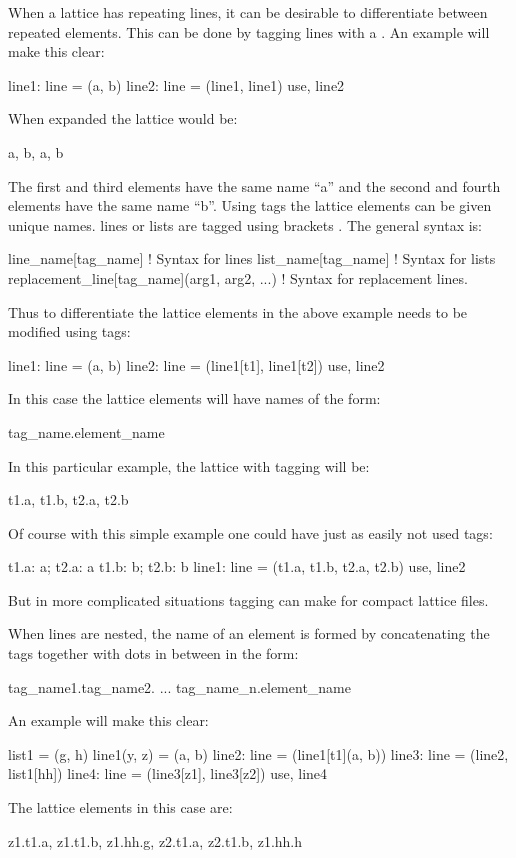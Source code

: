 When a lattice has repeating lines, it can be desirable to differentiate
between repeated elements. This can be done by tagging lines with a . 
An example will make this clear:
\begin{example}
  line1: line = (a, b)
  line2: line = (line1, line1)
  use, line2
\end{example}
When expanded the lattice would be:
\begin{example}
  a, b, a, b
\end{example}
The first and third elements have the same name ``a'' and the second and fourth
elements have the same name ``b''. Using tags the lattice elements can be given
unique names. lines or lists are tagged  
using brackets \vn{[...]}. The general syntax is:
\begin{example}
  line_name[tag_name]                           ! Syntax for lines
  list_name[tag_name]                           ! Syntax for lists
  replacement_line[tag_name](arg1, arg2, ...)   ! Syntax for replacement lines.
\end{example}
Thus to differentiate the lattice elements in the above example  needs to
be modified using tags:
\begin{example}
  line1: line = (a, b)
  line2: line = (line1[t1], line1[t2])
  use, line2
\end{example}
In this case the lattice elements will have names of the form:
\begin{example}
  tag_name.element_name
\end{example}
In this particular example, the lattice with tagging will be:
\begin{example}
  t1.a, t1.b, t2.a, t2.b
\end{example}
Of course with this simple example one could have just as easily not used tags:
\begin{example}
  t1.a: a;   t2.a: a
  t1.b: b;   t2.b: b
  line1: line = (t1.a, t1.b, t2.a, t2.b)
  use, line2
\end{example}
But in more complicated situations tagging can make for compact lattice files.

When lines are nested, the name of an element is formed by concatenating the tags
together with dots in between in the form:
\begin{example}
  tag_name1.tag_name2. ... tag_name_n.element_name
\end{example}
An example will make this clear:
\begin{example}
  list1 = (g, h)
  line1(y, z) = (a, b)
  line2: line = (line1[t1](a, b))
  line3: line = (line2, list1[hh])
  line4: line = (line3[z1], line3[z2])
  use, line4
\end{example}
The lattice elements in this case are:
\begin{example}
  z1.t1.a, z1.t1.b, z1.hh.g, z2.t1.a, z2.t1.b, z1.hh.h 
\end{example}

